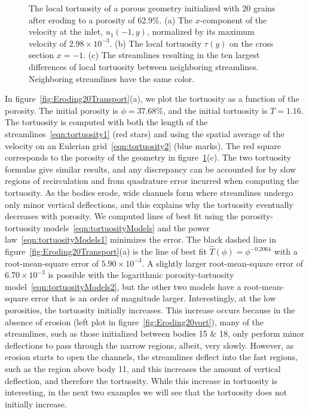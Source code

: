 \documentclass{jfm}
\begin{document}
\begin{figure}
\begin{subfigure}[b]{0.5\textwidth}
\caption{}
\end{subfigure}
\caption{\label{fig:Eroding20tort} The local tortuosity of a porous
geometry initialized with 20 grains after eroding to a porosity of
62.9\%.  (a) The $x$-component of the velocity at the inlet,
$u_1(-1,y)$, normalized by its maximum velocity of $2.98 \times
10^{-3}$. (b) The local tortuosity $\tau(y)$ on the cross section $x =
-1$. (c) The streamlines resulting in the ten largest differences of
local tortuosity between neighboring streamlines.  Neighboring
streamlines have the same color.}
\end{figure}

In figure~\ref{fig:Eroding20Transport}(a), we plot the tortuosity as a
function of the porosity. The initial porosity is $\phi = 37.68\%$, and
the initial tortuosity is $T = 1.16$.  The tortuosity is computed with
both the length of the streamlines~\eqref{eqn:tortuosity1} (red stars)
and using the spatial average of the velocity on an Eulerian
grid~\eqref{eqn:tortuosity2} (blue marks).  The red square corresponds
to the porosity of the geometry in figure~\ref{fig:Eroding20tort}(c).
The two tortuosity formulas give similar results, and any discrepancy
can be accounted for by slow regions of recirculation and from
quadrature error incurred when computing the tortuosity.  As the bodies
erode, wide channels form where streamlines undergo only minor vertical
deflections, and this explains why the tortuosity eventually decreases
with porosity.  We computed lines of best fit using the
porosity-tortuosity models~\eqref{eqn:tortuosityModels} and the power
law~\eqref{eqn:tortuosityModels1} minimizes the error.  The  black
dashed line in figure~\ref{fig:Eroding20Transport}(a) is the line of
best fit $\widehat{T}(\phi) = \phi^{-0.2064}$ with a root-mean-square
error of $5.90 \times 10^{-3}$.  A slightly larger root-mean-square
error of $6.70 \times 10^{-3}$ is possible with the logarithmic
porosity-tortuosity model~\eqref{eqn:tortuosityModels2}, but the other
two models have a root-mean-square error that is an order of magnitude
larger. Interestingly, at the low porosities, the tortuosity initially
increases. This increase occurs because in the absence of erosion (left
plot in figure~\ref{fig:Eroding20vort}), many of the streamlines, such
as those initialized between bodies 15 \& 18, only perform minor
deflections to pass through the narrow regions, albeit, very slowly.
However, as erosion starts to open the channels, the streamlines deflect
into the fast regions, such as the region above body 11, and this
increases the amount of vertical deflection, and therefore the
tortuosity. While this increase in tortuosity is interesting, in the
next two examples we will see that the tortuosity does not initially
increase.
\end{document}
